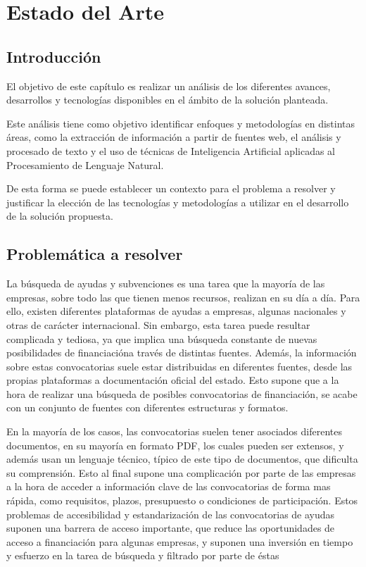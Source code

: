 \chapter{Estado del Arte}
\label{chapter:Estado del Arte}


\section{Introducción}
El objetivo de este capítulo es realizar un análisis de los diferentes avances, desarrollos y tecnologías disponibles en el ámbito de la solución planteada. 

Este análisis tiene como objetivo identificar enfoques y metodologías en distintas áreas, como la extracción de información a partir de fuentes web, el análisis y procesado de texto y el uso de técnicas de Inteligencia Artificial aplicadas al Procesamiento de Lenguaje Natural.

De esta forma se puede establecer un contexto para el problema a resolver y justificar la elección de las tecnologías y metodologías a utilizar en el desarrollo de la solución propuesta.

\section{Problemática a resolver}

La búsqueda de ayudas y subvenciones es una tarea que la mayoría de las empresas, sobre todo las que tienen menos recursos, realizan en su día a día.
Para ello, existen diferentes plataformas de ayudas a empresas, algunas nacionales y otras de carácter internacional. 
Sin embargo, esta tarea puede resultar complicada y tediosa, ya que implica una búsqueda constante de nuevas posibilidades de financiacióna través de distintas fuentes.
Además, la información sobre estas convocatorias suele estar distribuidas en diferentes fuentes, desde las propias plataformas a documentación oficial del estado.
Esto supone que a la hora de realizar una búsqueda de posibles convocatorias de financiación, se acabe con un conjunto de fuentes con diferentes estructuras y formatos.

En la mayoría de los casos, las convocatorias suelen tener asociados diferentes documentos, en su mayoría en formato PDF, los cuales pueden ser extensos, y además usan un lenguaje técnico, típico de este tipo de documentos, que dificulta su comprensión.
Esto al final supone una complicación por parte de las empresas a la hora de acceder a información clave de las convocatorias de forma mas rápida, como requisitos, plazos, presupuesto o condiciones de participación.
Estos problemas de accesibilidad y estandarización de las convocatorias de ayudas suponen una barrera de acceso importante, que reduce las oportunidades de acceso a financiación para algunas empresas, y suponen una inversión en tiempo y esfuerzo en la tarea de búsqueda y filtrado por parte de éstas

